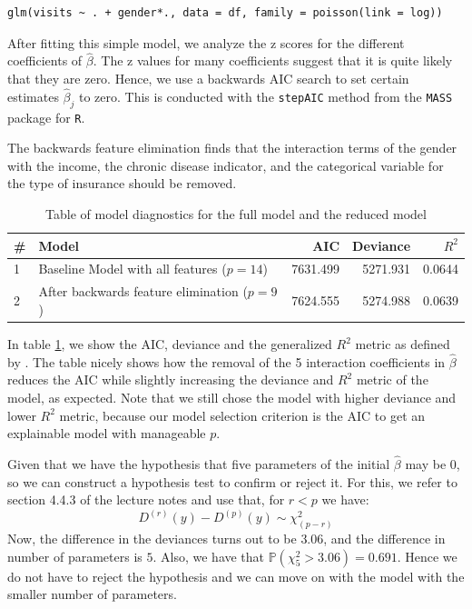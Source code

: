 \documentclass[a4paper,11pt]{article}
\begin{document}
\begin{verbatim}
glm(visits ~ . + gender*., data = df, family = poisson(link = log))
\end{verbatim}

After fitting this simple model, we analyze the z scores for the different coefficients of $\hat{\beta}$. The z values for many coefficients suggest that it is quite likely that they are zero. Hence, we use a backwards AIC search to set certain estimates $\hat{\beta}_j$ to zero.  This is conducted with the \texttt{stepAIC} method from the \texttt{MASS} package for \texttt{R}.

The backwards feature elimination finds that the interaction terms of the gender with the income, the chronic disease indicator, and the categorical variable for the type of insurance should be removed.

\begin{table}[h]
    \centering
    \begin{tabular}{l|l|r|r|r}
    \hline
 \# &Model & AIC & Deviance & $R^2$\\
    \hline
1&    Baseline Model with all features ($p=14$) &  7631.499 & 5271.931 & 0.0644\\
2&    After backwards feature elimination ($p=9$) & 7624.555 & 5274.988  & 0.0639\\
        \hline
        
    \end{tabular}
    \caption{Table of model diagnostics for the full model and the reduced model}
    \label{tab:backwards_elimination}
\end{table}
In table \ref{tab:backwards_elimination}, we show the AIC, deviance and the generalized $R^2$ metric as defined by \cite{cameron}. The table nicely shows how the removal of the 5 interaction coefficients in $\hat{\beta}$ reduces the AIC while slightly increasing the deviance and $R^2$ metric of the model, as expected. Note that we still chose the model with higher deviance and lower $R^2$ metric, because our model selection criterion is the AIC to get an explainable model with manageable $p$.

Given that we have the hypothesis that five parameters of the initial $\hat{\beta}$ may be $0$, so we can construct a hypothesis test to confirm or reject it. For this, we refer to section 4.4.3 of the lecture notes and use that, for $r<p$ we have:
\begin{equation}
D^{(r)}(y) - D^{(p)}(y) \sim \chi^2_{(p-r)}
\end{equation}
Now, the difference in the deviances turns out to be $3.06$, and the difference in number of parameters is $5$. Also, we have that $\mathbb{P}( \chi^2_{5} > 3.06) = 0.691$. Hence we do not have to reject the hypothesis and we can move on with the model with the smaller number of parameters.
\end{document}

